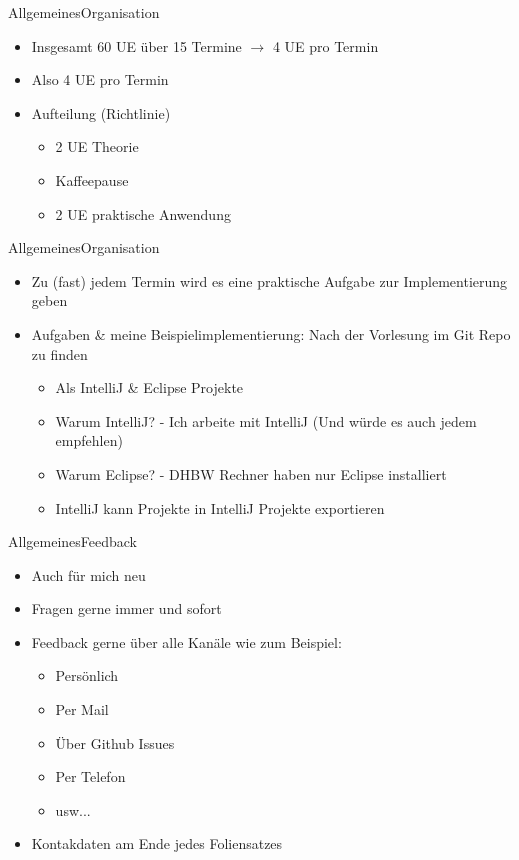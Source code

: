 \begin{frame}{Allgemeines}{Organisation}
	\begin{itemize}
		\item Insgesamt 60 UE über 15 Termine $\rightarrow$ 4 UE pro Termin
		\item Also 4 UE pro Termin
		\item Aufteilung (Richtlinie)
		\begin{itemize}
			\item 2 UE Theorie
			\item Kaffeepause
			\item 2 UE praktische Anwendung
		\end{itemize}
	\end{itemize}
\end{frame}

\begin{frame}{Allgemeines}{Organisation}
	\begin{itemize}
		\item Zu (fast) jedem Termin wird es eine praktische Aufgabe zur Implementierung geben
		\item Aufgaben \& meine Beispielimplementierung: Nach der Vorlesung im Git Repo zu finden
		\begin{itemize}
			\item Als IntelliJ \& Eclipse Projekte
			\item Warum IntelliJ? - Ich arbeite mit IntelliJ (Und würde es auch jedem empfehlen)
			\item Warum Eclipse? - DHBW Rechner haben nur Eclipse installiert
			\item IntelliJ kann Projekte in IntelliJ Projekte exportieren
		\end{itemize}
	\end{itemize}
\end{frame}

\begin{frame}{Allgemeines}{Feedback}
	\begin{itemize}
		\item Auch für mich neu
		\item Fragen gerne immer und sofort
		\item Feedback gerne über alle Kanäle wie zum Beispiel:
		\begin{itemize}
			\item Persönlich
			\item Per Mail
			\item Über Github Issues
			\item Per Telefon
			\item usw...
		\end{itemize}
		\item Kontakdaten am Ende jedes Foliensatzes
	\end{itemize}
\end{frame}